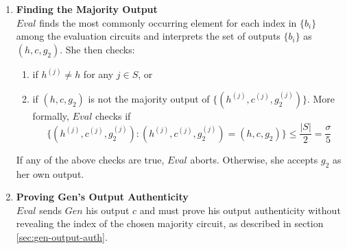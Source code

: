 \documentclass{article}
\begin{document}
\begin{enumerate}
	\item \label{step:majority} \textbf{Finding the Majority Output}\\
	$Eval$ finds the most commonly occurring element for each index in $\{b_{i}\}$ among the evaluation circuits and interprets the set of outputs $\{ b_{i} \}$ as $(h,c,g_{2})$. She then checks:
	\begin{enumerate}[label=(\alph*)]
		\item if $h^{(j)} \neq h$ for any $j \in S$, or
		\item if $(h,c,g_{2})$ is not the majority output of $\{ (h^{(j)},c^{(j)},g_{2}^{(j)}) \}$. More formally, $Eval$ checks if
		$$ \big\{ (h^{(j)},c^{(j)}, g_{2}^{(j)}) : (h^{(j)}, c^{(j)}, g_{2}^{(j)}) =(h,c,g_{2}) \big\} \leq \frac{|S|}{2} = \frac{\sigma}{5}$$
	\end{enumerate}
	If any of the above checks are true, $Eval$ aborts. Otherwise, she accepts $g_{2}$ as her own output.
	
	\item \label{step:gen-out-auth} \textbf{Proving Gen's Output Authenticity}\\
	$Eval$ sends $Gen$ his output $c$ and must prove his output authenticity without revealing the index of the chosen majority circuit, as described in section \ref{sec:gen-output-auth}.
	
\end{enumerate}




\end{document}

